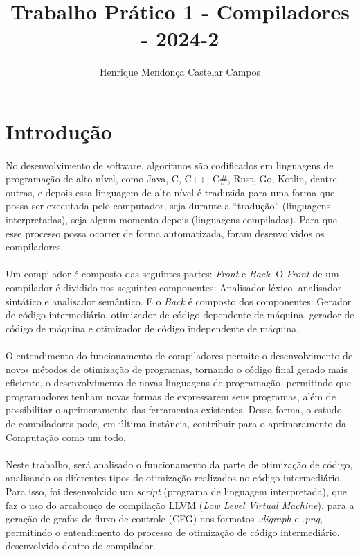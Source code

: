 \documentclass[12pt]{article}
\title{Trabalho Prático 1 - Compiladores - 2024-2}
\author{Henrique Mendonça Castelar Campos}
\begin{document}
\maketitle

\section{Introdução}

\paragraph{}No desenvolvimento de software, algoritmos são codificados em linguagens de programação de alto nível, como Java, C, C++, C\#, Rust, Go, Kotlin, dentre outras, e depois essa linguagem de alto nível é traduzida para uma forma que possa ser executada pelo computador, seja durante a “tradução” (linguagens interpretadas), seja algum momento depois (linguagens compiladas). Para que esse processo possa ocorrer de forma automatizada, foram desenvolvidos os compiladores.

\paragraph{}Um compilador é composto das seguintes partes: \textit{Front} e \textit{Back}. O \textit{Front} de um compilador é dividido nos seguintes componentes: Analisador léxico, analisador sintático e analisador semântico. E o \textit{Back} é composto dos componentes: Gerador de código intermediário, otimizador de código dependente de máquina, gerador de código de máquina e otimizador de código independente de máquina.\cite{introducao}

\paragraph{}O entendimento do funcionamento de compiladores permite o desenvolvimento de novos métodos de otimização de programas, tornando o código final gerado mais eficiente, o desenvolvimento de novas linguagens de programação, permitindo que programadores tenham novas formas de expressarem seus programas, além de possibilitar o aprimoramento das ferramentas existentes. Dessa forma, o estudo de compiladores pode, em última instância, contribuir para o aprimoramento da Computação como um todo.

\paragraph{}Neste trabalho, será analisado o funcionamento da parte de otimização de código, analisando os diferentes tipos de otimização realizados no código intermediário. Para isso, foi desenvolvido um \textit{script} (programa de linguagem interpretada), que faz o uso do arcabouço de compilação LLVM (\textit{Low Level Virtual Machine}), para a geração de grafos de fluxo de controle (CFG) nos formatos \textit{.digraph} e \textit{.png}, permitindo o entendimento do processo de otimização de código intermediário, desenvolvido dentro do compilador.
\end{document}
